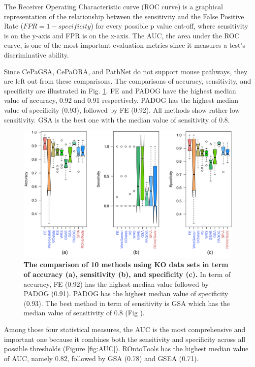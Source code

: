 The Receiver Operating Characteristic curve (ROC curve) is a graphical representation of the relationship between the sensitivity and the False Positive Rate ($FPR = 1-specificity$) for every possible p value cut-off, where sensitivity is on the y-axis and FPR is on the x-axis. The AUC, the area under the ROC curve, is one of the most important evaluation metrics since it measures a test's discriminative ability.
 

Since CePaGSA, CePaORA, and PathNet do not support mouse pathways, they are left out from these comparisons. 
The comparisons of accuracy, sensitivity, and specificity are illustrated in Fig. \ref{fig:AccSenSpe}.
FE and PADOG have the highest median value of accuracy, 0.92 and 0.91 respectively. PADOG has the highest median value of specificity (0.93), followed by FE (0.92). 
All methods show rather low sensitivity. 
GSA is the best one with the median value of sensitivity of 0.8. 

\begin{figure}
\centering
  \captionsetup{width=0.7\linewidth}

	\includegraphics[width=1\linewidth]{../Figures/Acc_Sens_Spec_v3}
	\caption{\textbf{The comparison of 10 methods using KO data sets in term of accuracy (a), sensitivity (b), and specificity (c).} In term of accuracy, FE (0.92) has the highest median value followed by PADOG (0.91). PADOG has the highest median value of specificity (0.93). The best method in term of sensitivity is GSA which has the median value of sensitivity of 0.8 (Fig \label{fig:AccSenSpe}).}
\end{figure}


Among those four statistical measures, the AUC is the most comprehensive and important one because it combines both the sensitivity and specificity across all possible thresholds (Figure \ref{fig:AUC}).
ROntoTools has the highest median value of AUC, namely 0.82, followed by GSA (0.78) and GSEA (0.71).

